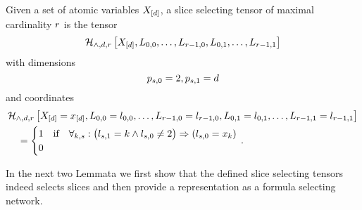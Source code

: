 \begin{definition}
	Given a set of atomic variables $X_{[d]}$, a slice selecting tensor of maximal cardinality $r$ is the tensor
		\[ \mathcal{H}_{\land,d,r}\left[X_{[d]},L_{0,0},\ldots,L_{r-1,0},L_{0,1},\ldots,L_{r-1,1}\right] \]
	with dimensions
		\[ p_{s,0} = 2, p_{s,1} = d \]
	and coordinates
	\begin{align*}
		& \mathcal{H}_{\land,d,r}\left[X_{[d]}=x_{[d]},L_{0,0}=l_{0,0},\ldots,L_{r-1,0}=l_{r-1,0},L_{0,1}=l_{0,1},\ldots,L_{r-1,1}=l_{r-1,1}\right] \\
		& \quad = \begin{cases}
			1 & \text{if} \quad 
			\forall_{k,s} : \big(  l_{s,1} = k \land l_{s,0} \neq 2 \big) \Rightarrow  (l_{s,0} = x_{k})  \\
			0
		\end{cases} \, . 
	\end{align*}
\end{definition}

In the next two Lemmata we first show that the defined slice selecting tensors indeed selects slices and then provide a representation as a formula selecting network.

